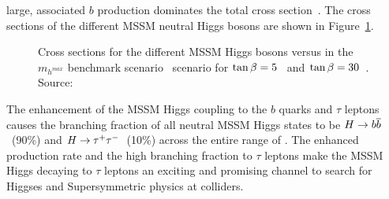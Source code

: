 large, associated $b$ production dominates the total cross section~\cite{LHCHiggsXSecGroup}. The cross sections of the different MSSM
neutral Higgs bosons are shown in Figure~\ref{fig:MSSMXSectionsTanBeta}.
\begin{figure}
  \centering
  \caption[MSSM Higgs cross sections at the LHC]{Cross sections for the
  different MSSM Higgs bosons versus \ma in the $m_{h^{max}}$ benchmark
  scenario~\cite{MHMaxBenchmark} scenario for
  $\tan\beta=5$~ and
  $\tan\beta=30$~.  Source:~\cite{LHCHiggsXSecGroup}
  }
  \label{fig:MSSMXSectionsTanBeta}
\end{figure}
The \tanb enhancement of the MSSM Higgs coupling to the $b$ quarks and $\tau$
leptons causes the branching fraction of all neutral MSSM Higgs states to be
$H\to{b\overline{b}}$~(90\%) and $H\to\tau^+\tau^-$~(10\%) across the entire range of \ma.  The
enhanced production rate and the high branching fraction to $\tau$ leptons make
the MSSM Higgs decaying to $\tau$ leptons an exciting and promising channel to
search for Higgses and Supersymmetric physics at colliders.

